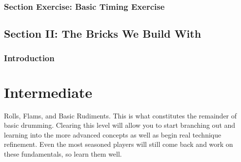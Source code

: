 \documentclass[12pt,letterpaper]{book}
\begin{document}
\section{Section Exercise: Basic Timing Exercise}

\chapter{Section II: The Bricks We Build With}

\section{Introduction}


\part{Intermediate}

Rolls, Flams, and Basic Rudiments. This is what constitutes the remainder of basic drumming. Clearing this level will allow you to start branching out and learning into the more advanced concepts as well as begin real technique refinement. Even the most seasoned players will still come back and work on these fundamentals, so learn them well.
\end{document}
